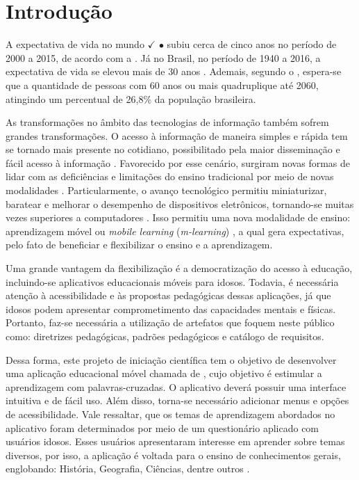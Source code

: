 \chapter{Introdução}
\label{sec:introd}
A expectativa de vida no mundo $\checkmark$ $\bullet$ subiu cerca de cinco anos no período de 2000 a 2015, de acordo com a \cite{world2016world}. Já no Brasil, no período de 1940 a 2016, a expectativa de vida se elevou mais de 30 anos \citep{expectativabrasileiros}. Ademais, segundo o \cite{demografico2010disponivel}, espera-se que a quantidade de pessoas com 60 anos ou mais quadruplique até 2060, atingindo um percentual de 26,8\% da população brasileira.

As transformações no âmbito das tecnologias de informação também sofrem grandes transformações. O acesso à informação de maneira simples e rápida tem se tornado mais presente no cotidiano, possibilitado pela maior disseminação e fácil acesso à informação \citep{Grossi2014}. Favorecido por esse cenário, surgiram novas formas de lidar com as deficiências e limitações do ensino tradicional por meio de novas modalidades \citep{Behrens2005}. Particularmente, o avanço tecnológico permitiu miniaturizar, baratear e melhorar o desempenho de dispositivos eletrônicos, tornando-se muitas vezes superiores a computadores \citep{Zamfirache2013}. Isso permitiu uma nova modalidade de ensino: aprendizagem móvel ou \textit{mobile learning} (\textit{m-learning}) \citep{Crompton2013, Keegan2005, Traxler2006, Wu2012}, a qual gera expectativas, pelo fato de beneficiar e flexibilizar o ensino e a aprendizagem.

Uma grande vantagem da flexibilização é a democratização do acesso à educação, incluindo-se aplicativos educacionais móveis para idosos. Todavia, é necessária atenção à acessibilidade e às propostas pedagógicas dessas aplicações, já que idosos podem apresentar comprometimento das capacidades mentais e físicas. Portanto, faz-se necessária a utilização de artefatos que foquem neste público como: diretrizes pedagógicas, padrões pedagógicos e catálogo de requisitos.

Dessa forma, este projeto de iniciação científica tem o objetivo de desenvolver uma aplicação educacional móvel chamada de \crossword, cujo objetivo é estimular a aprendizagem com palavras-cruzadas. O aplicativo deverá possuir uma interface intuitiva e de fácil uso. Além disso, torna-se necessário adicionar menus e opções de acessibilidade. Vale ressaltar, que os temas de aprendizagem abordados no aplicativo foram determinados por meio de um questionário aplicado com usuários idosos. Esses usuários apresentaram interesse em aprender sobre temas diversos, por isso, a aplicação é voltada para o ensino de conhecimentos gerais, englobando: História, Geografia, Ciências, dentre outros \citep{oliveira2018crossword}. 

